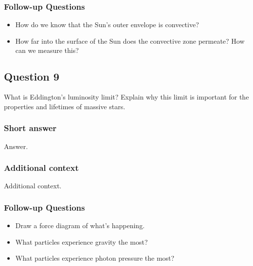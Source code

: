 \documentclass[a4paper,10pt]{article}
\begin{document}
\subsubsection{Follow-up Questions}

\begin{itemize}
    \item How do we know that the Sun's outer envelope is convective?
    \item How far into the surface of the Sun does the convective zone permeate? How can we measure this?
\end{itemize}


\newpage
\subsection{Question 9}

What is Eddington’s luminosity limit? Explain why this limit is important for the properties and lifetimes of massive stars.

\subsubsection{Short answer}

Answer.

\subsubsection{Additional context}

Additional context.

\subsubsection{Follow-up Questions}

\begin{itemize}
    \item Draw a force diagram of what’s happening.
    \item What particles experience gravity the most?
    \item What particles experience photon pressure the most?
\end{itemize}

\end{document}
